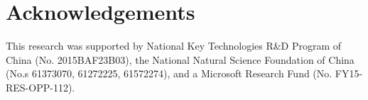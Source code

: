 \section{Acknowledgements}
This research was supported by National Key Technologies R\&D Program of China (No. 2015BAF23B03), the National Natural Science Foundation of China (No.s 61373070, 61272225, 61572274), and a Microsoft Research Fund (No. FY15-RES-OPP-112). 
